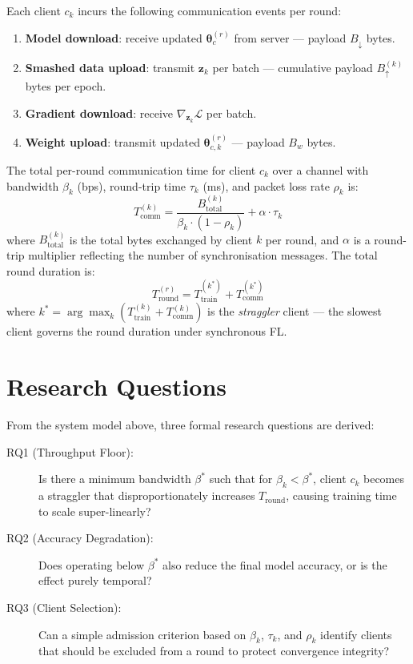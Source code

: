 \documentclass[12pt,a4paper]{report}
\begin{document}
Each client $c_k$ incurs the following communication events per round:
\begin{enumerate}
  \item \textbf{Model download}: receive updated $\boldsymbol{\theta}_c^{(r)}$ from server — payload $B_\downarrow$ bytes.
  \item \textbf{Smashed data upload}: transmit $\mathbf{z}_k$ per batch — cumulative payload $B_\uparrow^{(k)}$ bytes per epoch.
  \item \textbf{Gradient download}: receive $\nabla_{\mathbf{z}_k} \mathcal{L}$ per batch.
  \item \textbf{Weight upload}: transmit updated $\boldsymbol{\theta}_{c,k}^{(r)}$ — payload $B_w$ bytes.
\end{enumerate}

The total per-round communication time for client $c_k$ over a channel with bandwidth $\beta_k$ (bps), round-trip time $\tau_k$ (ms), and packet loss rate $\rho_k$ is:
\begin{equation}
  T_{\mathrm{comm}}^{(k)} = \frac{B_{\mathrm{total}}^{(k)}}{\beta_k \cdot (1-\rho_k)} + \alpha \cdot \tau_k
  \label{eq:tcomm}
\end{equation}
where $B_{\mathrm{total}}^{(k)}$ is the total bytes exchanged by client $k$ per round, and $\alpha$ is a round-trip multiplier reflecting the number of synchronisation messages. The total round duration is:
\begin{equation}
  T_{\mathrm{round}}^{(r)} = T_{\mathrm{train}}^{(k^*)} + T_{\mathrm{comm}}^{(k^*)}
  \label{eq:tround}
\end{equation}
where $k^* = \arg\max_k (T_{\mathrm{train}}^{(k)} + T_{\mathrm{comm}}^{(k)})$ is the \emph{straggler} client — the slowest client governs the round duration under synchronous FL.

\section{Research Questions}

From the system model above, three formal research questions are derived:

\begin{description}
  \item[RQ1 (Throughput Floor):] Is there a minimum bandwidth $\beta^*$ such that for $\beta_k < \beta^*$, client $c_k$ becomes a straggler that disproportionately increases $T_{\mathrm{round}}$, causing training time to scale super-linearly?
  \item[RQ2 (Accuracy Degradation):] Does operating below $\beta^*$ also reduce the final model accuracy, or is the effect purely temporal?
  \item[RQ3 (Client Selection):] Can a simple admission criterion based on $\beta_k$, $\tau_k$, and $\rho_k$ identify clients that should be excluded from a round to protect convergence integrity?
\end{description}
\end{document}
